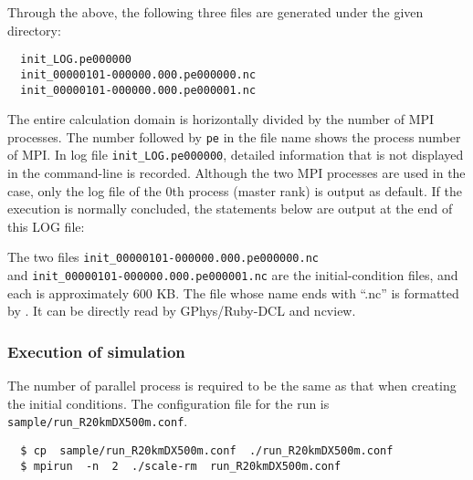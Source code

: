 
Through the above, the following three files are generated under the given directory:
\begin{verbatim}
  init_LOG.pe000000
  init_00000101-000000.000.pe000000.nc
  init_00000101-000000.000.pe000001.nc
\end{verbatim}
The entire calculation domain is horizontally divided by the number of MPI processes.
The number followed by \verb|pe| in the file name shows the process number of MPI.
In log file \verb|init_LOG.pe000000|,
detailed information that is not displayed in the command-line is recorded.
Although the two MPI processes are used in the case,
only the log file of the 0th process (master rank) is output as default.
If the execution is normally concluded, the statements below are output at the end of this LOG file:


The two files
\verb|init_00000101-000000.000.pe000000.nc|\\ and \verb|init_00000101-000000.000.pe000001.nc| are the initial-condition files, and each is approximately 600 KB.
The file whose name ends with ``.nc''  is formatted by \netcdf.
It can be directly read by GPhys/Ruby-DCL and ncview.


\subsubsection{Execution of simulation} %

The number of parallel process is required to be the same as that when creating the initial conditions.
The configuration file for the run is \verb|sample/run_R20kmDX500m.conf|.
\begin{verbatim}
  $ cp  sample/run_R20kmDX500m.conf  ./run_R20kmDX500m.conf
  $ mpirun  -n  2  ./scale-rm  run_R20kmDX500m.conf
\end{verbatim}

